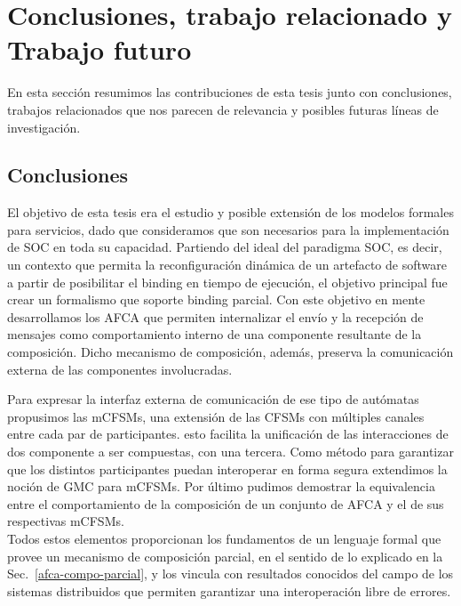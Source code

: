 \newpage
\chapter{Conclusiones, trabajo relacionado y Trabajo futuro} 
\label{conclusiones}

En esta sección resumimos las contribuciones de esta tesis junto con conclusiones, trabajos relacionados que nos parecen de relevancia y posibles futuras líneas de investigación.


\section{Conclusiones} 

El objetivo de esta tesis era el estudio y posible extensión de los modelos formales para servicios, dado que consideramos que son necesarios para la implementación de SOC en toda su capacidad. Partiendo del ideal del paradigma SOC, es decir, un contexto que permita la reconfiguración dinámica de un artefacto de software a partir de posibilitar el binding en tiempo de ejecución, el objetivo principal fue crear un formalismo que soporte binding parcial. Con este objetivo en mente desarrollamos los AFCA que permiten internalizar el envío y la recepción de mensajes como comportamiento interno de una componente resultante de la composición. Dicho mecanismo de composición, además, preserva la comunicación externa de las componentes involucradas.

Para expresar la interfaz externa de comunicación de ese tipo de autómatas propusimos las mCFSMs, una extensión de las CFSMs con múltiples canales entre cada par de participantes. esto facilita la unificación de las interacciones de dos componente a ser compuestas, con una tercera. Como método para garantizar que los distintos participantes puedan interoperar en forma segura extendimos la noción de GMC para mCFSMs. Por último pudimos demostrar la equivalencia entre el comportamiento de la composición de un conjunto de AFCA y el de sus respectivas mCFSMs.\\
Todos estos elementos proporcionan los fundamentos de un lenguaje formal que provee un mecanismo de composición parcial, en el sentido de lo explicado en la Sec.~\ref{afca-compo-parcial}, y los vincula con resultados conocidos del campo de los sistemas distribuidos que permiten garantizar una interoperación libre de errores.

